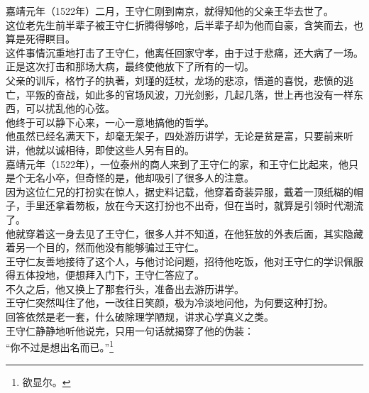 \begin{multicols}{\theparacolNo}
嘉靖元年（1522年）二月，王守仁刚到南京，就得知他的父亲王华去世了。\\

这位老先生前半辈子被王守仁折腾得够呛，后半辈子却为他而自豪，含笑而去，也算是死得瞑目。\\

这件事情沉重地打击了王守仁，他离任回家守孝，由于过于悲痛，还大病了一场。\\

正是这次打击和那场大病，最终使他放下了所有的一切。\\

父亲的训斥，格竹子的执著，刘瑾的廷杖，龙场的悲凉，悟道的喜悦，悲愤的逃亡，平叛的奋战，如此多的官场风波，刀光剑影，几起几落，世上再也没有一样东西，可以扰乱他的心弦。\\

他终于可以静下心来，一心一意地搞他的哲学。\\

他虽然已经名满天下，却毫无架子，四处游历讲学，无论是贫是富，只要前来听讲，他就以诚相待，即使这些人另有目的。\\

嘉靖元年（1522年），一位泰州的商人来到了王守仁的家，和王守仁比起来，他只是个无名小卒，但奇怪的是，他却吸引了很多人的注意。\\

因为这位仁兄的打扮实在惊人，据史料记载，他穿着奇装异服，戴着一顶纸糊的帽子，手里还拿着笏板，放在今天这打扮也不出奇，但在当时，就算是引领时代潮流了。\\

他就穿着这一身去见了王守仁，很多人并不知道，在他狂放的外表后面，其实隐藏着另一个目的，然而他没有能够骗过王守仁。\\

王守仁友善地接待了这个人，与他讨论问题，招待他吃饭，他对王守仁的学识佩服得五体投地，便想拜入门下，王守仁答应了。\\

不久之后，他又换上了那套行头，准备出去游历讲学。\\

王守仁突然叫住了他，一改往日笑颜，极为冷淡地问他，为何要这种打扮。\\

回答依然是老一套，什么破除理学陋规，讲求心学真义之类。\\

王守仁静静地听他说完，只用一句话就揭穿了他的伪装：\\

“你不过是想出名而已。”\footnote{欲显尔。}\\


\end{multicols}
